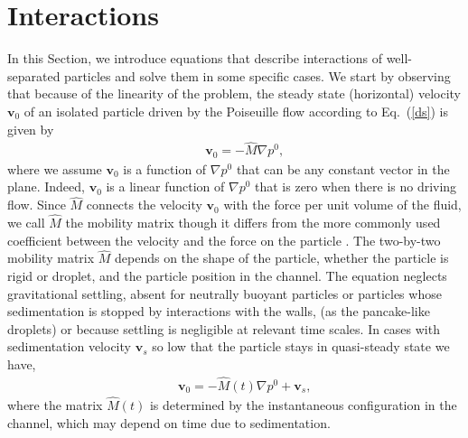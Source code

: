\section{Interactions}\label{interactions}

In this Section, we introduce equations that describe interactions of well-separated particles and solve them in some specific cases. We start by observing that because of the 
linearity of the problem, the steady state (horizontal) velocity $\bm v_0$ of an isolated particle driven by the Poiseuille flow according to Eq.~(\ref{ds}) is given by
\begin{eqnarray}&&\!\!\!\!\!\!\!\!\!\!
\bm v_0=-{\hat M}\nabla p^0, \label{steady}
\end{eqnarray}
where we assume $\bm v_0$ is a function of $\nabla p^0$ that can be any constant vector in the plane. Indeed, $\bm v_0$ is a linear function of $\nabla p^0$ that is zero when there is no driving flow. Since ${\hat M}$  connects the velocity $\bm v_0$ with the force per unit volume of the fluid,  we call ${\hat M}$ the mobility matrix though it differs 
from the more commonly used coefficient between the velocity and the force on the particle \citep{hb}. 
The two-by-two mobility matrix ${\hat M}$ depends on the shape of the particle, whether the particle is rigid or droplet, and the particle position in the channel. The equation neglects gravitational settling, absent for neutrally buoyant particles or particles whose sedimentation is stopped by interactions with the walls,
(as the pancake-like droplets) or because settling is negligible at relevant time scales. In cases with sedimentation velocity $\bm v_s$ so low that the particle stays in quasi-steady state we have,
\begin{eqnarray}&&\!\!\!\!\!\!\!\!\!\!
\bm v_0=-{\hat M}(t)\nabla p^0+\bm v_s,
\end{eqnarray}
where the matrix ${\hat M}(t)$ is determined by the instantaneous configuration in the channel, which may depend on time due to sedimentation.

